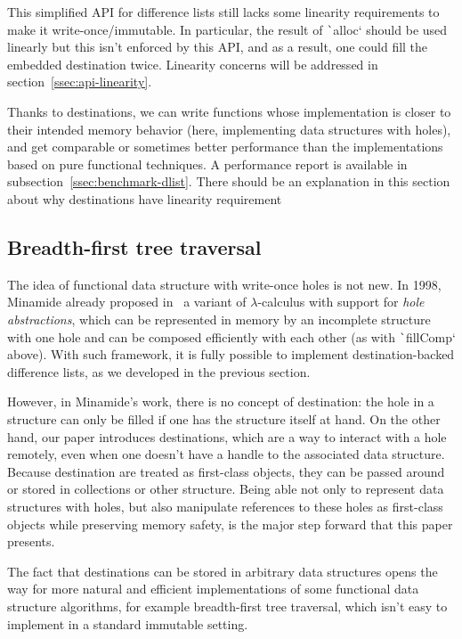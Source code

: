 \documentclass[english]{jflart}
\newcommand{\TODO}[1]{{\color{red}\large #1}}
\begin{document}
This simplified API for difference lists still lacks some linearity requirements to make it write-once/immutable. In particular, the result of \texttt`alloc` should be used linearly but this isn't enforced by this API, and as a result, one could fill the embedded destination twice. Linearity concerns will be addressed in section~\ref{ssec:api-linearity}.

Thanks to destinations, we can write functions whose implementation is closer to their intended memory behavior (here, implementing data structures with holes), and get comparable or sometimes better performance than the implementations based on pure functional techniques. A performance report is available in subsection~\ref{ssec:benchmark-dlist}.
\TODO{There should be an explanation in this section about why destinations have linearity requirement}

\subsection{Breadth-first tree traversal}\label{ssec:bf-tree-traversal}

The idea of functional data structure with write-once holes is not new. In 1998, Minamide already proposed in~\cite{minamide_functional_1998} a variant of $\lambda$-calculus with support for \emph{hole abstractions}, which can be represented in memory by an incomplete structure with one hole and can be composed efficiently with each other (as with \texttt`fillComp` above). With such framework, it is fully possible to implement destination-backed difference lists, as we developed in the previous section.

However, in Minamide's work, there is no concept of destination: the hole in a structure can only be filled if one has the structure itself at hand. On the other hand, our paper introduces destinations, which are a way to interact with a hole remotely, even when one doesn't have a handle to the associated data structure. Because destination are treated as first-class objects, they can be passed around or stored in collections or other structure. Being able not only to represent data structures with holes, but also manipulate references to these holes as first-class objects while preserving memory safety, is the major step forward that this paper presents.

The fact that destinations can be stored in arbitrary data structures opens the way for more natural and efficient implementations of some functional data structure algorithms, for example breadth-first tree traversal, which isn't easy to implement in a standard immutable setting.
\end{document}
